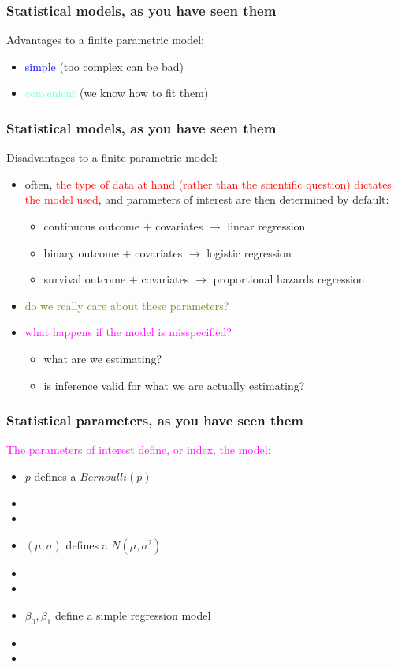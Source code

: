 \documentclass[12pt, 
hyperref={colorlinks=true, linkcolor=blue, urlcolor=cyan},dvipsnames]{beamer}
\begin{document}
\begin{frame}
\frametitle{Statistical models, as you have seen them}
Advantages to a finite parametric model: \vspace{-0.3cm}
\begin{itemize}
\item \textcolor{blue}{simple} (too complex can be bad)
\item \textcolor{Aquamarine}{convenient} (we know how to fit them)
\end{itemize}

\end{frame}

\begin{frame}
\frametitle{Statistical models, as you have seen them}
Disadvantages to a finite parametric model: \vspace{-0.3cm}
\begin{itemize}
\item often, \textcolor{red}{the type of data at hand (rather than the scientific question) dictates the model used}, and parameters of interest are then determined by default:
\begin{itemize}
\item continuous outcome $+$ covariates $\rightarrow$ linear regression
\item binary outcome $+$ covariates $\rightarrow$ logistic regression
\item survival outcome $+$ covariates $\rightarrow$ proportional hazards regression
\end{itemize}
\item \textcolor{olive}{do we really care about these parameters?}
\item \textcolor{magenta}{what happens if the model is misspecified?}
\begin{itemize}
\item what are we estimating?
\item is inference valid for what we are actually estimating?
\end{itemize}
\end{itemize}
\end{frame}

\begin{frame}
\frametitle{Statistical parameters, as you have seen them}

\textcolor{magenta}{The parameters of interest define, or index, the model:} \vspace{-0.3cm}
\begin{itemize}
\item $p$ defines a $Bernoulli(p)$
\item[]
\item[]
\item $(\mu, \sigma)$ defines a $N(\mu, \sigma^2)$
\item[]
\item[]
\item $\beta_0, \beta_1$ define a simple regression model
\item[]
\item[]
\end{itemize}

\end{frame}
\end{document}
